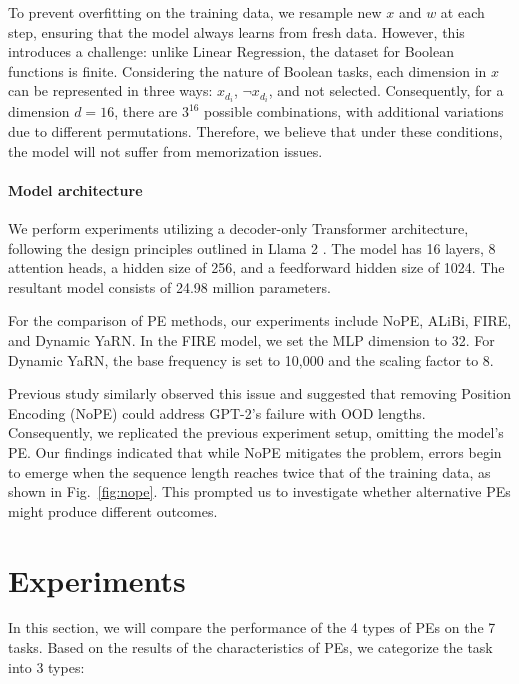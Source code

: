 \documentclass[letterpaper]{article} %
\begin{document}
To prevent overfitting on the training data, we resample new $x$ and $w$ at each step, ensuring that the model always learns from fresh data. However, this introduces a challenge: unlike Linear Regression, the dataset for Boolean functions is finite. Considering the nature of Boolean tasks, each dimension in $x$ can be represented in three ways: $x_{d_i}$, $\neg x_{d_i}$, and not selected. Consequently, for a dimension $d = 16$, there are $3^{16}$ possible combinations, with additional variations due to different permutations. Therefore, we believe that under these conditions, the model will not suffer from memorization issues.

\paragraph{Model architecture}
We perform experiments utilizing a decoder-only Transformer architecture, following the design principles outlined in Llama 2 \cite{touvron-2023-llama2}. The model has 16 layers, 8 attention heads, a hidden size of 256, and a feedforward hidden size of 1024. The resultant model consists of 24.98 million parameters.

For the comparison of PE methods, our experiments include NoPE, ALiBi, FIRE, and Dynamic YaRN. In the FIRE model, we set the MLP dimension to 32. For Dynamic YaRN, the base frequency is set to 10,000 and the scaling factor to 8.

Previous study \cite{panwar-2024-incontext} similarly observed this issue and suggested that removing Position Encoding (NoPE) could address GPT-2's failure with OOD lengths. Consequently, we replicated the previous experiment setup, omitting the model's PE. Our findings indicated that while NoPE mitigates the problem, errors begin to emerge when the sequence length reaches twice that of the training data, as shown in Fig.~\ref{fig:nope}. This prompted us to investigate whether alternative PEs might produce different outcomes.

\section{Experiments}

In this section, we will compare the performance of the 4 types of PEs on the 7 tasks. Based on the results of the characteristics of PEs, we categorize the task into 3 types:
\end{document}
